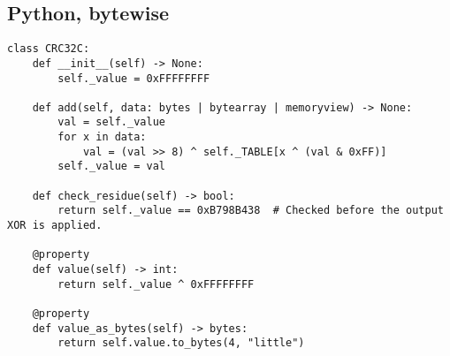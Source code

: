 \subsection{Python, bytewise}

\begin{samepage}
\begin{verbatim}
class CRC32C:
    def __init__(self) -> None:
        self._value = 0xFFFFFFFF

    def add(self, data: bytes | bytearray | memoryview) -> None:
        val = self._value
        for x in data:
            val = (val >> 8) ^ self._TABLE[x ^ (val & 0xFF)]
        self._value = val

    def check_residue(self) -> bool:
        return self._value == 0xB798B438  # Checked before the output XOR is applied.

    @property
    def value(self) -> int:
        return self._value ^ 0xFFFFFFFF

    @property
    def value_as_bytes(self) -> bytes:
        return self.value.to_bytes(4, "little")


\end{verbatim}
\end{samepage}
